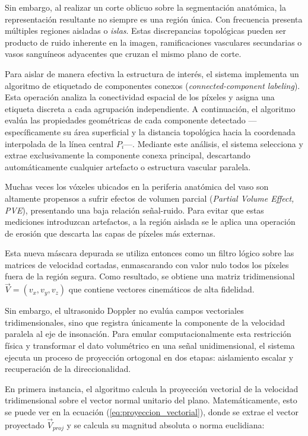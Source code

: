 Sin embargo, al realizar un corte oblicuo sobre la segmentación anatómica, la representación resultante no siempre es una región única. Con frecuencia presenta múltiples regiones aisladas o \textit{islas}. Estas discrepancias topológicas pueden ser producto de ruido inherente en la imagen, ramificaciones vasculares secundarias o vasos sanguíneos adyacentes que cruzan el mismo plano de corte.

Para aislar de manera efectiva la estructura de interés, el sistema implementa un algoritmo de etiquetado de componentes conexos (\textit{connected-component labeling}). Esta operación analiza la conectividad espacial de los píxeles y asigna una etiqueta discreta a cada agrupación independiente. A continuación, el algoritmo evalúa las propiedades geométricas de cada componente detectado —específicamente su área superficial y la distancia topológica hacia la coordenada interpolada de la línea central $P_i$—. Mediante este análisis, el sistema selecciona y extrae exclusivamente la componente conexa principal, descartando automáticamente cualquier artefacto o estructura vascular paralela.

Muchas veces los vóxeles ubicados en la periferia anatómica del vaso son altamente propensos a sufrir efectos de volumen parcial (\textit{Partial Volume Effect, PVE}), presentando una baja relación señal-ruido. Para evitar que estas mediciones introduzcan artefactos, a la región aislada se le aplica una operación de erosión que descarta las capas de píxeles más externas.

Esta nueva máscara depurada se utiliza entonces como un filtro lógico sobre las matrices de velocidad cortadas, enmascarando con valor nulo todos los píxeles fuera de la región segura. Como resultado, se obtiene una matriz tridimensional $\vec{V} = (v_x, v_y, v_z)$ que contiene vectores cinemáticos de alta fidelidad.

Sin embargo, el ultrasonido Doppler no evalúa campos vectoriales tridimensionales, sino que registra únicamente la componente de la velocidad paralela al eje de insonación. Para emular computacionalmente esta restricción física y transformar el dato volumétrico en una señal unidimensional, el sistema ejecuta un proceso de proyección ortogonal en dos etapas: aislamiento escalar y recuperación de la direccionalidad.

En primera instancia, el algoritmo calcula la proyección vectorial de la velocidad tridimensional sobre el vector normal unitario del plano. Matemáticamente, esto se puede ver en la ecuación (\ref{eq:proyeccion_vectorial}), donde se extrae el vector proyectado $\vec{V}_{proj}$ y se calcula su magnitud absoluta o norma euclidiana:

